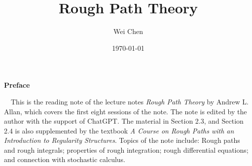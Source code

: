 \documentclass[12pt,oneside]{book}
\title{{\Huge{\textbf{Rough Path Theory}}}}
\author{Wei Chen}
\date{\today}
\theoremstyle{mystyle}
\theoremstyle{cstyle}
\theoremstyle{warn}
\begin{document}
	\maketitle
	\allowdisplaybreaks
	\setcounter{page}{1}
	\begin{center}
		\Large\textbf{Preface}
    \end{center}~\
    This is the reading note of the lecture notes \textit{Rough Path Theory} by Andrew L. Allan, which covers the first eight sessions of the note. The note is edited by the author with the support of ChatGPT. The material in Section 2.3, and Section 2.4 is also supplemented by the textbook \textit{A Course on Rough Paths with an Introduction to Regularity Structures}. Topics of the note include: Rough paths and rough integrals; properties of rough integration; rough differential equations; and connection with stochastic calculus.
	
	
	\newpage
	\tableofcontents
	\clearpage
    
    
    
    
    
\end{document}
